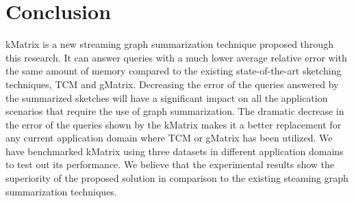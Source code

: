 \section{Conclusion}
\label{sec:conclusion}

kMatrix is a new streaming graph summarization technique proposed through this research. It can answer queries with a much lower average relative error with the same amount of memory compared to the existing state-of-the-art sketching techniques, TCM and gMatrix. Decreasing the error of the queries answered by the summarized sketches will have a significant impact on all the application scenarios that require the use of graph summarization. The dramatic decrease in the error of the queries shown by the kMatrix makes it a better replacement for any current application domain where TCM or gMatrix has been utilized. We have benchmarked kMatrix using three datasets in different application domains to test out its performance.  We believe that the experimental results show the superiority of the proposed solution in comparison to the existing steaming graph summarization techniques.